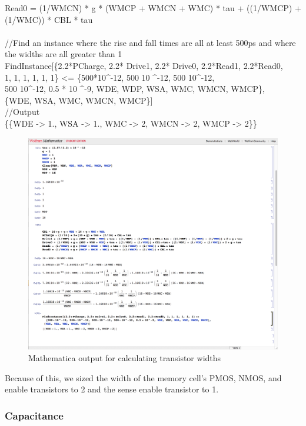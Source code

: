 \documentclass[a4paper]{article}
\newcommand\tab[1][1cm]{\hspace*{#1}}
\begin{document}
{Read0 = (1/WMCN) * g * (WMCP + WMCN  + WMC) * tau + ((1/WMCP) +\\
\tab (1/WMC)) * CBL * tau\\
\\
\textnormal{//Find an instance where the rise and fall times are all at least 500ps and where the widths are all greater than 1}\\
FindInstance[\{2.2*PCharge, 2.2* Drive1, 2.2* Drive0, 2.2*Read1, 2.2*Read0,\\
\tab 1, 1, 1, 1, 1, 1\} <= \{500*10\textasciicircum -12, 500 10 \textasciicircum -12, 500 10\textasciicircum -12,\\
\tab 500 10\textasciicircum -12, 0.5 * 10 \textasciicircum -9, WDE, WDP, WSA, WMC, WMCN, WMCP\},\\
\tab \{WDE, WSA, WMC, WMCN, WMCP\}]\\
\textnormal{//Output}\\
\{\{WDE -> 1., WSA -> 1., WMC -> 2, WMCN -> 2, WMCP -> 2\}\}
}

\begin{figure}[H]
	\centering
	\includegraphics[scale=0.3]{sizingMath}
	\caption{Mathematica output for calculating transistor widths}
	\label{fig:sizingMath}
\end{figure}

Because of this, we sized the width of the memory cell's PMOS, NMOS, and enable transistors to 2 and the sense enable transistor to 1. 

\subsubsection{Capacitance}
\label{subsec:cap_calc}
\end{document}
